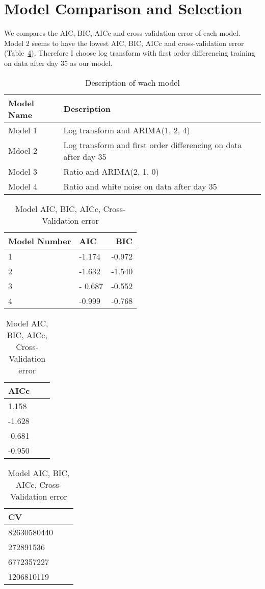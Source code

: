 \documentclass[a4paper]{article}
\begin{document}
\section{Model Comparison and Selection}\label{sec:selection}

We compares the AIC, BIC, AICc and cross validation error of each model.  Model 2
seems to have the lowest AIC, BIC, AICc  and cross-validation
error (Table~\ref{tab:param_est}). Therefore I choose log transform with first
order differencing training on data after day 35 as our model.

\begin{table}[H]
\centering

\begin{tabular}{llr}
	  Model Name & Description  \\ \hline
	 Model 1 & Log transform and ARIMA(1, 2, 4)  \\
	Mdoel 2 & Log transform and first order differencing on data after day 35 \\
		Model 3 & Ratio and ARIMA(2, 1, 0) \\
		Model 4 & Ratio and white noise on data after day 35 \\
	\end{tabular}
	\caption{Description of wach model}
	\label{tab:desc}
\end{table}


\begin{table}[H]
\centering

\begin{tabular}{llr}
	   Model Number & AIC & BIC \\ \hline
	  1 & -1.174 &  -0.972 \\
	  2 & -1.632 & -1.540 \\
	  3 & - 0.687 & -0.552 \\
          4& -0.999 & -0.768 \\
\end{tabular}%
\begin{tabular}{llr}
	    AICc \\ \hline
	   1.158\\
	  -1.628 \\
	  -0.681 \\
           -0.950 \\
\end{tabular}%
\begin{tabular}{llr}
	   CV \\ \hline
	  82630580440 \\
	 272891536 \\
          6772357227 \\
        1206810119 \\
\end{tabular}
       \caption{Model AIC, BIC, AICc, Cross-Validation error}
       \label{tab:param_est}
\end{table}
\end{document}
